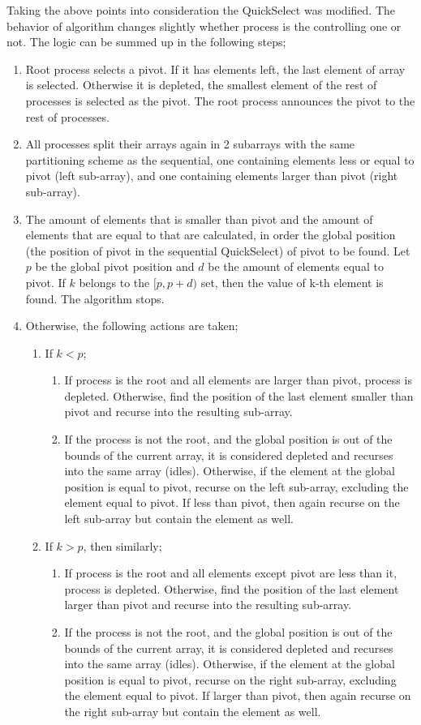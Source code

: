 \documentclass[11pt]{article}
\begin{document}
Taking the above points into consideration the QuickSelect was modified. The behavior of algorithm changes slightly whether process is the controlling one or not. The logic can be summed up in the following steps;
\begin{enumerate}
\item Root process selects a pivot. If it has elements left, the last element of array is selected. Otherwise it is depleted, the smallest element of the rest of processes is selected as the pivot. The root process announces the pivot to the rest of processes.
\item All processes split their arrays again in 2 subarrays with the same partitioning scheme as the sequential, one containing elements less or equal to pivot (left sub-array), and one containing elements larger than pivot (right sub-array).
\item The amount of elements that is smaller than pivot and the amount of elements that are equal to that are calculated, in order the global position (the position of pivot in the sequential QuickSelect) of pivot to be found. Let \(p\) be the global pivot position and \(d\) be the amount of elements equal to pivot. If \(k\) belongs to the \([p, p+d)\) set, then the value of k-th element is found. The algorithm stops.
\item Otherwise, the following actions are taken;
\begin{enumerate}
\item If \(k < p\);
\begin{enumerate}
\item If process is the root and all elements are larger than pivot, process is depleted. Otherwise, find the position of the last element smaller than pivot and recurse into the resulting sub-array.
\item If the process is not the root, and the global position is out of the bounds of the current array, it is considered depleted and recurses into the same array (idles). Otherwise, if the element at the global position is equal to pivot, recurse on the left sub-array, excluding the element equal to pivot. If less than pivot, then again recurse on the left sub-array but contain the element as well.
\end{enumerate}
\item If \(k > p\), then similarly;
\begin{enumerate}
\item If process is the root and all elements except pivot are less than it, process is depleted. Otherwise, find the position of the last element larger than pivot and recurse into the resulting sub-array.
\item If the process is not the root, and the global position is out of the bounds of the current array, it is considered depleted and recurses into the same array (idles). Otherwise, if the element at the global position is equal to pivot, recurse on the right sub-array, excluding the element equal to pivot. If larger than pivot, then again recurse on the right sub-array but contain the element as well.
\end{enumerate}
\end{enumerate}
\end{enumerate}
\pagebreak
\end{document}
